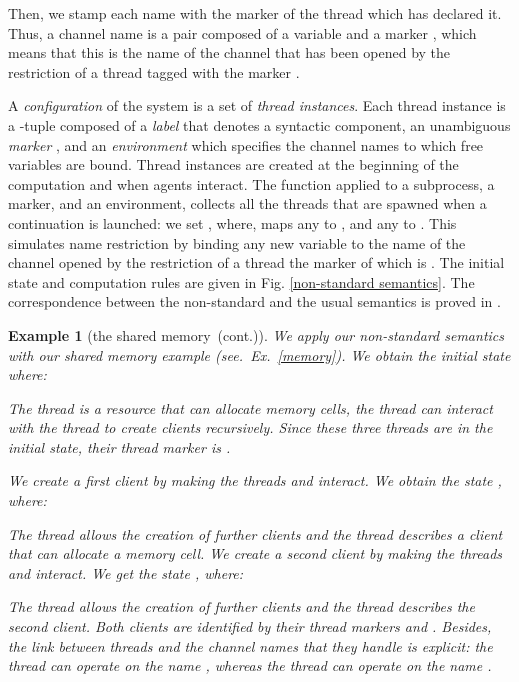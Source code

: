 \documentclass{article}
\newcommand{\boxexample}{}
\newtheorem{example}[thm]{Example}
\newcommand{\continued}{(cont.)}
\newcommand{\cnonunu}{\shareanalysis\ \continued}
\newcommand{\shareanalysis}{the shared memory}
\begin{document}
Then, we stamp each  name with  the marker of the thread  which has declared it. Thus, a channel name is a pair  composed of a variable  and a marker , which means  that this is the name of the channel that has been opened by the restriction  of a thread tagged with the marker  .

A \emph{configuration} of the system  is  a set of \emph{thread instances}. 
Each thread instance is a -tuple composed of a \emph{label}   that denotes a syntactic component, an unambiguous \emph{marker} , and an \emph{environment}  which specifies the channel names to which free variables are bound.
Thread instances are created at the beginning of the computation and when agents interact. 
The function   applied to a subprocess, a marker, and an environment, collects all the threads that are spawned when a continuation is launched: we set 
 , where,  maps 
any  to ,  
and any  to .
This simulates name restriction by binding any new  variable  to the name of the channel opened by the restriction  of a thread the marker of which is .
The initial state and computation rules are given in Fig. \ref{non-standard semantics}. The correspondence between the non-standard and the usual semantics  is proved   in \cite{feret:jlap,feret:thesis}.



\begin{example}[\cnonunu]
We apply our non-standard semantics with our shared memory example (see.~Ex.~\ref{memory}). We obtain the initial state  where:

The thread  is a resource that can allocate memory cells, the thread  can interact with the thread  to create clients recursively. Since these three  threads  are in the initial state, their thread marker is . 

We create a first client by making the threads  and  interact. 
We obtain the state , where:

The thread  
allows the creation of further clients 
and the thread  describes a client that can allocate a memory cell. 
We create a second client by making the threads  and  interact. 
We get the state , where:

The thread  
allows the creation of further clients 
and the thread   describes the second  client. 
Both clients are identified by their thread markers  and . Besides, the link between threads and the channel names that they handle is explicit: the thread  can operate on the name , whereas the thread  can operate on the name .
\boxexample\end{example}
\end{document}
